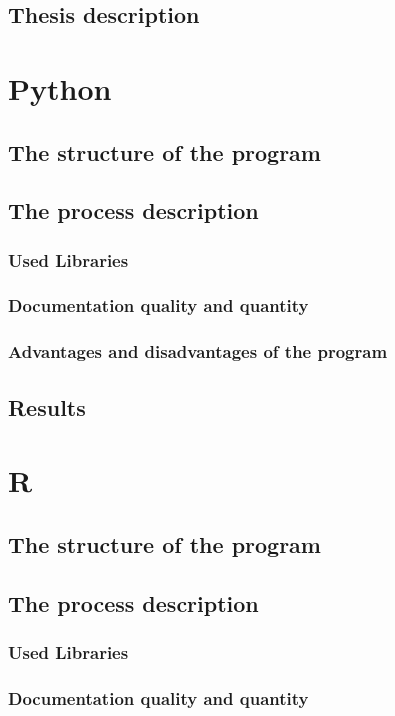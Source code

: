 \documentclass{article}
\begin{document}
\subsection{Thesis description}


\newpage
\section{Python}
\subsection{The structure of the program}
\subsection{The process description}
\subsubsection{Used Libraries}
\subsubsection{Documentation quality and quantity}
\subsubsection{Advantages and disadvantages of the program}
\subsection{Results}

\newpage
\section{R}
\subsection{The structure of the program}
\subsection{The process description}
\subsubsection{Used Libraries}
\subsubsection{Documentation quality and quantity}
\end{document}
